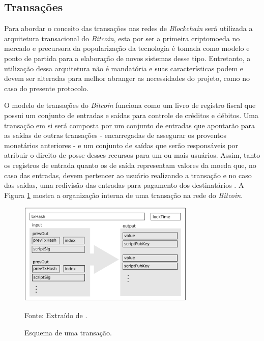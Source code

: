 \subsection{Transações}
\label{subsec:blobkchain:transacaoes}

Para abordar o conceito das transações nas redes de \textit{Blockchain} será utilizada a arquitetura transacional do \textit{Bitcoin}, esta por ser a primeira criptomoeda no mercado e precursora da popularização da tecnologia é tomada como modelo e ponto de partida para a elaboração de novos sistemas desse tipo. Entretanto, a utilização dessa arquitetura não é mandatória e suas características podem e devem ser alteradas para melhor abranger as necessidades do projeto, como no caso do presente protocolo.

%
O modelo de transações do \textit{Bitcoin} funciona como um livro de registro fiscal que possui um conjunto de entradas e saídas para controle de créditos e débitos. Uma transação em si será composta por um conjunto de entradas que apontarão para as saídas de outras transações - encarregadas de assegurar os proventos monetários anteriores - e um conjunto de saídas que serão responsáveis por atribuir o direito de posse desses recursos para um ou mais usuários. Assim, tanto os registros de entrada quanto os de saída representam valores da moeda que, no caso das entradas, devem pertencer ao usuário realizando a transação e no caso das saídas, uma redivisão das entradas para pagamento dos destinatários \cite{blockchain:documentacao_bitcoin}. A Figura \ref{fig:blockchain:transacao} mostra a organização interna de uma transação na rede do \textit{Bitcoin}.

\begin{figure}[ht]
\caption{Esquema de uma transação.}
\centering
\includegraphics[width=0.75\textwidth]{imagens/esquema_transacao.png}
\begin{center}
        Fonte: Extraído de \cite{blockchain:survey_bitcoin}.
\end{center}
\label{fig:blockchain:transacao}
\end{figure}

